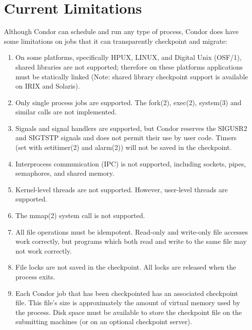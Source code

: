 \section{\label{sec:current-limitations}Current Limitations}

\begin{description}

	\item[Limitations on Jobs which can Checkpointed] Although Condor can schedule and
run any type of process, Condor does have some limitations on jobs that it can
transparently checkpoint and migrate:
\begin{enumerate}
	\item On some platforms, specifically HPUX, LINUX, 
and Digital Unix
(OSF/1),
shared libraries are not supported; therefore on these
platforms applications must be statically linked (Note: shared library
checkpoint support is available on IRIX and Solaris). 
	\item Only single process jobs are supported. The fork(2),
exec(2),
system(3)
and similar calls are not implemented.
	\item Signals and signal handlers 
are supported, but Condor reserves the 
SIGUSR2 and SIGTSTP signals and does not permit their use by user code.
Timers (set with setitimer(2)
and
alarm(2))
will not be saved in the checkpoint.
	\item Interprocess communication (IPC) is not
supported, including 
sockets, 
pipes,
semaphores, 
and shared memory.
	\item Kernel-level threads are not supported.  However, user-level
threads are supported.
	\item The mmap(2)
system call is not supported.
	\item All file operations must be idempotent.
Read-only and write-only file accesses work correctly,
but programs which both read and write to the same file may not
work correctly.
	\item File locks
are not saved in the checkpoint.  All locks
are released when the process exits.
	\item Each Condor job that has been checkpointed has an associated 
checkpoint file.
This file's size is approximately the amount of virtual memory used by the 
process. Disk space must be available to store the checkpoint file on the 
submitting machines (or on an optional checkpoint server).
\end{enumerate}


\end{description}
